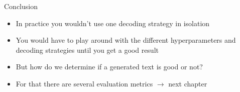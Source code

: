 \documentclass[11pt,compress,t,notes=noshow, xcolor=table]{beamer}
\begin{document}

\begin{vbframe}{Conclusion}

\vfill

\begin{itemize}
    \item In practice you wouldn't use one decoding strategy in isolation
    \item You would have to play around with the different hyperparameters and decoding strategies until you get a good result
    \item But how do we determine if a generated text is good or not?
    \item For that there are several evaluation metrics $\rightarrow$ next chapter
\end{itemize}


\vfill
    
\end{vbframe}


\endlecture
\end{document}
